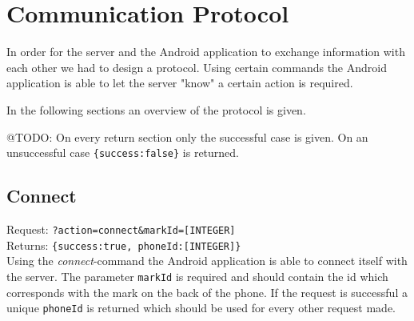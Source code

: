 \documentclass[a4paper,10pt]{article}
\begin{document}
\section{Communication Protocol}
\label{sec:communication-protocol}
In order for the server and the Android application to exchange information with each other we had to design a protocol.
Using certain commands the Android application is able to let the server "know" a certain action is required.

In the following sections an overview of the protocol is given.

@TODO: On every return section only the successful case is given. On an unsuccessful case \texttt{\{success:false\}} is returned.

\subsection{Connect}
Request: \texttt{?action=connect\&markId=[INTEGER]} \\
Returns: \texttt{\{success:true, phoneId:[INTEGER]\}} \\

\noindent Using the \emph{connect}-command the Android application is able to connect itself with the server.
The parameter \texttt{markId} is required and should contain the id which corresponds with the mark on the back of the phone.
If the request is successful a unique \texttt{phoneId} is returned which should be used for every other request made.
\end{document}
